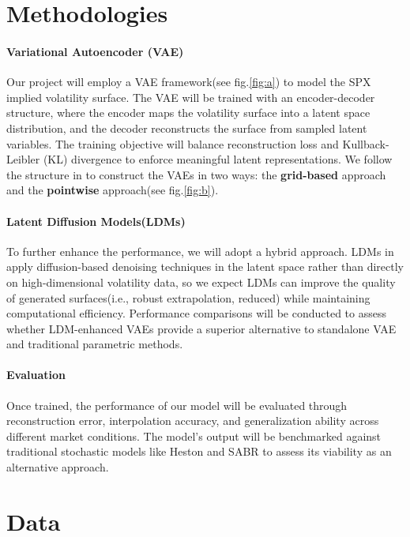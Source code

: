 \documentclass{article}
\begin{document}
\section{Methodologies}
\paragraph{Variational Autoencoder (VAE)}
Our project will employ a VAE framework(see fig.\ref{fig:a}) to model the SPX implied volatility surface. The VAE will be trained with an encoder-decoder structure, where the encoder maps the volatility surface into a latent space distribution, and the decoder reconstructs the surface from sampled latent variables. The training objective will balance reconstruction loss and Kullback-Leibler (KL) divergence to enforce meaningful latent representations. We follow the structure in \cite{vaeorigin} to construct the VAEs in two ways: the \textbf{grid-based} approach and the \textbf{pointwise} approach(see fig.\ref{fig:b}).

\paragraph{Latent Diffusion Models(LDMs)}
To further enhance the performance, we will adopt a hybrid approach. LDMs in \cite{rombach2022highresolutionimagesynthesislatent} apply diffusion-based denoising techniques in the latent space rather than directly on high-dimensional volatility data, so we expect LDMs can  improve the quality of generated surfaces(i.e., robust extrapolation, reduced) while maintaining computational efficiency. Performance comparisons will be conducted to assess whether LDM-enhanced VAEs provide a superior alternative to standalone VAE and traditional parametric methods.



\paragraph{Evaluation} Once trained, the performance of our model will be evaluated through reconstruction error, interpolation accuracy, and generalization ability across different market conditions. The model’s output will be benchmarked against traditional stochastic models like Heston \cite{wolfram_volsurface_heston} and SABR \cite{wolfram_volsurface_sabr} to assess its viability as an alternative approach.

\section{Data}
\end{document}
